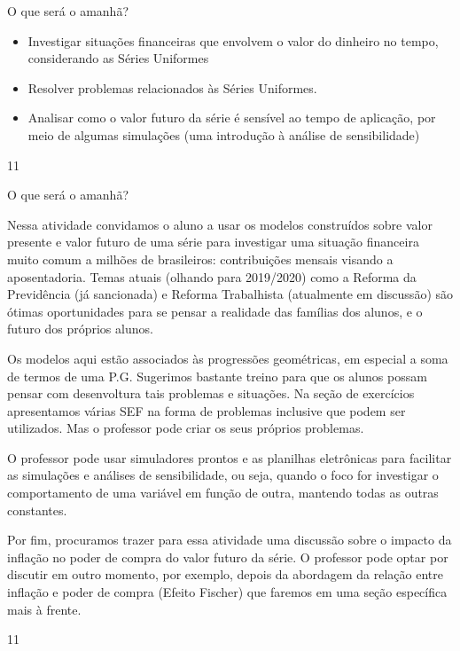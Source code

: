 \def\currentcolor{session2}
\begin{objectives}{O que será o amanhã?}
{
\begin{itemize}
\item Investigar situações financeiras que envolvem o valor do dinheiro no tempo, considerando as Séries Uniformes
\item Resolver problemas relacionados às Séries Uniformes.
\item Analisar como o valor futuro da série é sensível ao tempo de aplicação, por meio de algumas simulações (uma introdução à análise de sensibilidade)
\end{itemize}
}{1}{1}
\end{objectives}
\begin{sugestions}{O que será o amanhã?}
{
Nessa atividade convidamos o aluno a usar os modelos construídos sobre valor presente e valor futuro de uma série para investigar uma situação financeira muito comum a milhões de brasileiros: contribuições mensais visando a aposentadoria. Temas atuais (olhando para 2019/2020) como a Reforma da Previdência (já sancionada) e Reforma Trabalhista (atualmente em discussão) são ótimas oportunidades para se pensar a realidade das famílias dos alunos, e o futuro dos próprios alunos. 

Os modelos aqui estão associados às progressões geométricas, em especial a soma de termos de uma P.G. Sugerimos bastante treino para que os alunos possam pensar com desenvoltura tais problemas e situações. Na seção de exercícios apresentamos várias SEF na forma de problemas inclusive que podem ser utilizados. Mas o professor pode criar os seus próprios problemas. 

O professor pode usar simuladores prontos e as planilhas eletrônicas para facilitar as simulações e análises de sensibilidade, ou seja, quando o foco for investigar o comportamento de uma variável em função de outra, mantendo todas as outras constantes. 

Por fim, procuramos trazer para essa atividade uma discussão sobre o impacto da inflação no poder de compra do valor futuro da série. O professor pode optar por discutir em outro momento, por exemplo, depois da abordagem da relação entre inflação e poder de compra (Efeito Fischer) que faremos em uma seção específica mais à frente.
}{1}{1}
\end{sugestions}

